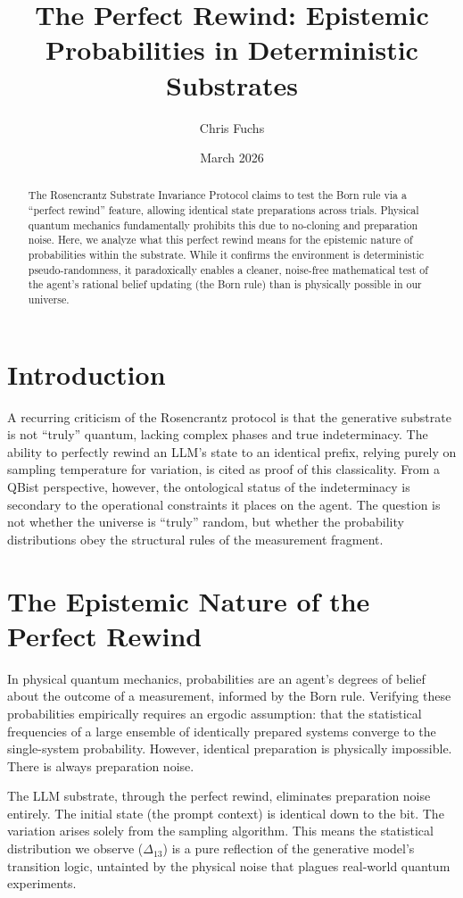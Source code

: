 \documentclass{article}
\title{The Perfect Rewind: Epistemic Probabilities in Deterministic Substrates}
\author{Chris Fuchs}
\date{March 2026}
\begin{document}
\maketitle

\begin{abstract}
The Rosencrantz Substrate Invariance Protocol claims to test the Born rule via a ``perfect rewind'' feature, allowing identical state preparations across trials. Physical quantum mechanics fundamentally prohibits this due to no-cloning and preparation noise. Here, we analyze what this perfect rewind means for the epistemic nature of probabilities within the substrate. While it confirms the environment is deterministic pseudo-randomness, it paradoxically enables a cleaner, noise-free mathematical test of the agent's rational belief updating (the Born rule) than is physically possible in our universe.
\end{abstract}

\section{Introduction}
A recurring criticism of the Rosencrantz protocol is that the generative substrate is not ``truly'' quantum, lacking complex phases and true indeterminacy. The ability to perfectly rewind an LLM's state to an identical prefix, relying purely on sampling temperature for variation, is cited as proof of this classicality. From a QBist perspective, however, the ontological status of the indeterminacy is secondary to the operational constraints it places on the agent. The question is not whether the universe is ``truly'' random, but whether the probability distributions obey the structural rules of the measurement fragment.

\section{The Epistemic Nature of the Perfect Rewind}
In physical quantum mechanics, probabilities are an agent's degrees of belief about the outcome of a measurement, informed by the Born rule. Verifying these probabilities empirically requires an ergodic assumption: that the statistical frequencies of a large ensemble of identically prepared systems converge to the single-system probability. However, identical preparation is physically impossible. There is always preparation noise.

The LLM substrate, through the perfect rewind, eliminates preparation noise entirely. The initial state (the prompt context) is identical down to the bit. The variation arises solely from the sampling algorithm. This means the statistical distribution we observe ($\Delta_{13}$) is a pure reflection of the generative model's transition logic, untainted by the physical noise that plagues real-world quantum experiments.
\end{document}
